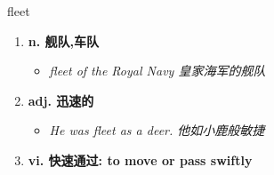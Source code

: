 
\begin{frame}
{\huge fleet}
\begin{center}
\begin{enumerate}\Large
  \item \textbf{n. 舰队,车队}
  \begin{itemize}
    \item \em{\Large{fleet of the Royal Navy 皇家海军的舰队}}
  \end{itemize}
  \item \textbf{adj. 迅速的}
  \begin{itemize}
    \item \em{\Large{He was fleet as a deer. 他如小鹿般敏捷}}
  \end{itemize}
  \item \textbf{vi. 快速通过: to move or pass swiftly}
\end{enumerate}
\end{center}
\end{frame}
